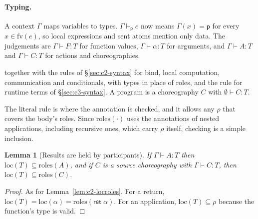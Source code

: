\documentclass[11pt]{report}
\theoremstyle{plain}
\newtheorem{lemma}[theorem]{Lemma}
\theoremstyle{definition}
\theoremstyle{remark}
\newcommand{\kw}[1]{\mathsf{#1}}
\newcommand{\pp}{\mathsf{p}}
\newcommand{\fv}{\mathrm{fv}}
\newcommand{\cret}[1]{\kw{ret}\;#1}
\newcommand{\roles}[1]{\mathrm{roles}(#1)}
\newcommand{\loc}[1]{\mathrm{loc}(#1)}
\newcommand{\farr}[3]{(#1) \xrightarrow{#2} #3}
\newcommand{\cfun}[5]{\kw{fun}\;#1(#2) \xrightarrow{#3} #4.\;#5}
\begin{document}
\paragraph{Typing.}
A context $\Gamma$ maps variables to types.  $\Gamma\vdash_\pp e$ now means
$\Gamma(x)=\pp$ for every $x\in\fv(e)$, so local expressions and sent atoms
mention only data.  The judgements are $\Gamma\vdash F:T$ for function values,
$\Gamma\vdash\alpha:T$ for arguments, and $\Gamma\vdash A:T$ and $\Gamma\vdash
C:T$ for actions and choreographies.
together with the rules of \S\ref{sec:c2-syntax} for bind, local computation,
communication and conditionals, with types in place of roles, and the rule
for runtime terms of \S\ref{sec:c3-syntax}.  A program is a choreography $C$
with $\emptyset\vdash C:T$.

The literal rule is where the annotation is checked, and it allows any
$\rho$ that covers the body's roles.  Since $\roles{\cdot}$ uses the
annotations of nested applications, including recursive ones, which carry
$\rho$ itself, checking is a simple inclusion.

\begin{lemma}[Results are held by participants]\label{lem:c4-locroles}
  If $\Gamma\vdash A:T$ then $\loc{T}\subseteq\roles{A}$, and if $C$ is a source
  choreography with $\Gamma\vdash C:T$, then $\loc{T}\subseteq\roles{C}$.
\end{lemma}
\begin{proof}
  As for Lemma~\ref{lem:c2-locroles}.  For a return,
  $\loc{T}=\loc{\alpha}=\roles{\cret{\alpha}}$.  For an application,
  $\loc{T}\subseteq\rho$ because the function's type is valid.
\end{proof}
\end{document}
